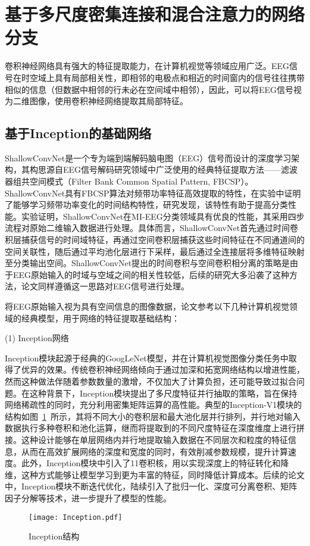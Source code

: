\section{基于多尺度密集连接和混合注意力的网络分支}

卷积神经网络具有强大的特征提取能力，在计算机视觉等领域应用广泛。EEG信号在时空域上具有局部相关性，即相邻的电极点和相近的时间窗内的信号往往携带相似的信息（但数据中相邻的行未必在空间域中相邻），因此，可以将EEG信号视为二维图像，使用卷积神经网络提取其局部特征。

\subsection{基于Inception的基础网络}

ShallowConvNet\cite{schirrmeister2017deep}是一个专为端到端解码脑电图（EEG）信号而设计的深度学习架构，其构思源自EEG信号解码研究领域中广泛使用的经典特征提取方法——滤波器组共空间模式（Filter Bank Common Spatial Pattern, FBCSP）\cite{ang2008filter}。ShallowConvNet具有FBCSP算法对频带功率特征高效提取的特性，在实验中证明了能够学习频带功率变化的时间结构特性\cite{schirrmeister2017deep}，研究发现，该特性有助于提高分类性能\cite{sakhavi2015parallel}。实验证明，ShallowConvNet在MI-EEG分类领域具有优良的性能\cite{lawhern2018eegnet}，其采用四步流程对原始二维输入数据进行处理。具体而言，ShallowConvNet首先通过时间卷积层捕获信号的时间域特征，再通过空间卷积层捕获这些时间特征在不同通道间的空间关联性，随后通过平均池化层进行下采样，最后通过全连接层将多维特征映射至分类输出空间。ShallowConvNet提出的时间卷积与空间卷积相分离的策略是由于EEG原始输入的时域与空域之间的相关性较低，后续的研究大多沿袭了这种方法，论文同样遵循这一思路对EEG信号进行处理。

将EEG原始输入视为具有空间信息的图像数据，论文参考以下几种计算机视觉领域的经典模型，用于网络的特征提取基础结构：

(1) Inception网络

Inception模块起源于经典的GoogLeNet模型\cite{szegedy2015going}，并在计算机视觉图像分类任务中取得了优异的效果。传统卷积神经网络倾向于通过加深和拓宽网络结构以增进性能，然而这种做法伴随着参数数量的激增，不仅加大了计算负担，还可能导致过拟合问题。在这种背景下，Inception模块提出了多尺度特征并行抽取的策略，旨在保持网络稀疏性的同时，充分利用密集矩阵运算的高性能。典型的Inception-V1模块的结构如图~\ref{fig:Inception}~所示，其将不同大小的卷积层和最大池化层并行排列，并行地对输入数据执行多种卷积和池化运算，继而将提取到的不同尺度特征在深度维度上进行拼接。这种设计能够在单层网络内并行地提取输入数据在不同层次和粒度的特征信息，从而在高效扩展网络的深度和宽度的同时，有效削减参数规模，提升计算速度。此外，Inception模块中引入了1\times1卷积核，用以实现深度上的特征转化和降维，这种方式能够让模型学习到更为丰富的特征，同时降低计算成本。后续的论文中，Inception模块不断迭代优化，陆续引入了批归一化、深度可分离卷积、矩阵因子分解等技术，进一步提升了模型的性能\cite{szegedy2016rethinking}\cite{szegedy2017inception}。
\begin{figure}
  \centering
  \texttt{[image: Inception.pdf]}
  \caption{Inception结构}
  \label{fig:Inception}
\end{figure}

